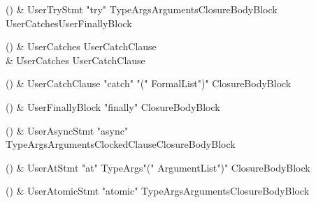 \begin{bbgrammarappendix}{3.8in}

() & UserTryStmt \label{prod:UserTryStmt}  \:
 \xcd"try" TypeArgs\opt Arguments\opt ClosureBodyBlock UserCatches\opt UserFinallyBlock\opt

\end{bbgrammarappendix}

\begin{bbgrammarappendix}{3.8in}

() & UserCatches \label{prod:UserCatches}  \:
         UserCatchClause  \\
 &    \| UserCatches UserCatchClause

\end{bbgrammarappendix}

\begin{bbgrammarappendix}{3.8in}

() & UserCatchClause \label{prod:UserCatchClause}  \:
 \xcd"catch" \xcd"(" FormalList\opt \xcd")" ClosureBodyBlock

\end{bbgrammarappendix}

\begin{bbgrammarappendix}{3.8in}

() & UserFinallyBlock \label{prod:UserFinallyBlock}  \:
 \xcd"finally" ClosureBodyBlock

\end{bbgrammarappendix}

\begin{bbgrammarappendix}{3.8in}

() & UserAsyncStmt \label{prod:UserAsyncStmt}  \:
 \xcd"async" TypeArgs\opt Arguments\opt ClockedClause\opt ClosureBodyBlock

\end{bbgrammarappendix}

\begin{bbgrammarappendix}{3.8in}

() & UserAtStmt \label{prod:UserAtStmt}  \:
 \xcd"at" TypeArgs\opt \xcd"(" ArgumentList\opt \xcd")" ClosureBodyBlock

\end{bbgrammarappendix}

\begin{bbgrammarappendix}{3.8in}

() & UserAtomicStmt \label{prod:UserAtomicStmt}  \:
 \xcd"atomic" TypeArgs\opt Arguments\opt ClosureBodyBlock

\end{bbgrammarappendix}

